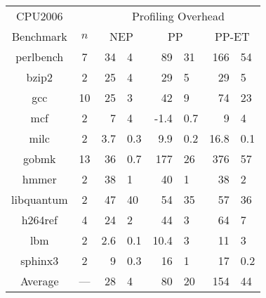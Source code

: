 \begin{tabular}{|c|c|r@{$\pm$}l|r@{$\pm$}l|r@{$\pm$}l|} \hline 
CPU2006   &     & \multicolumn{6}{c|}{Profiling Overhead} \\ \cline{3-8} 
Benchmark & $n$ & \multicolumn{2}{c|}{NEP} 
                & \multicolumn{2}{c|}{PP} 
                & \multicolumn{2}{c|}{PP-ET}  \\ \hline \hline 
perlbench  & 7  & 34&4    & 89&31    & 166&54     \\ \hline
bzip2      & 2  & 25&4    & 29&5     & 29&5       \\ \hline
gcc        & 10 & 25&3    & 42&9     & 74&23      \\ \hline
mcf        & 2  & 7&4     & -1.4&0.7 & 9&4        \\ \hline
milc       & 2  & 3.7&0.3 & 9.9&0.2  & 16.8&0.1   \\ \hline
gobmk      & 13 & 36&0.7  & 177&26   & 376&57     \\ \hline
hmmer      & 2  & 38&1    & 40&1     & 38&2       \\ \hline 
libquantum & 2  & 47&40   & 54&35    & 57&36      \\ \hline
h264ref    & 4  & 24&2    & 44&3     & 64&7       \\ \hline
lbm        & 2  & 2.6&0.1 & 10.4&3   & 11&3       \\ \hline
sphinx3    & 2  & 9&0.3   & 16&1     & 17&0.2     \\ \hline \hline
Average    & ---& 28&4    & 80&20    & 154&44     \\ \hline
\end{tabular}
